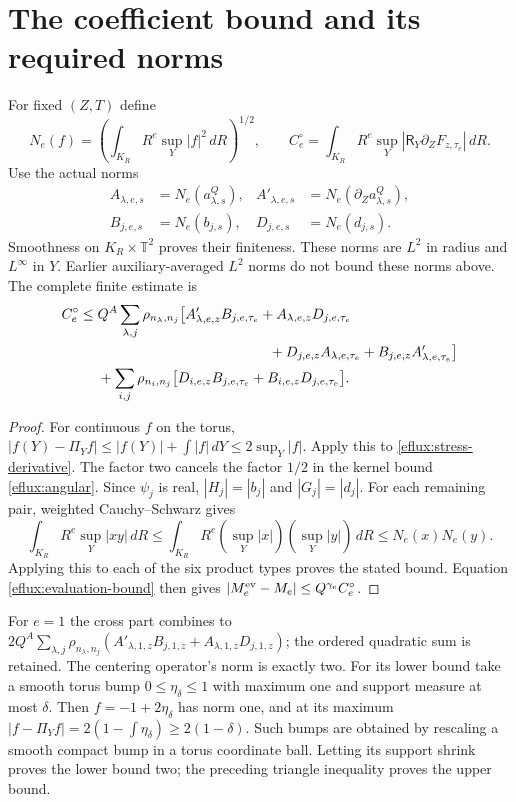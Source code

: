 \section{The coefficient bound and its required norms}
\label{eflux:bound-section}
For fixed $(Z,T)$ define
\[
N_e(f)=\left(\int_{K_R}R^e\sup_Y|f|^2\,dR\right)^{1/2},\qquad
C_e^\circ=\int_{K_R}R^e\sup_Y|\mathsf R_Y\partial_ZF_{z,\tau_e}|\,dR .
\]
Use the actual norms
\begin{equation}
\begin{aligned}
A_{\lambda,e,s}&=N_e(a^Q_{\lambda,s}),&
A'_{\lambda,e,s}&=N_e(\partial_Za^Q_{\lambda,s}),\\
B_{j,e,s}&=N_e(b_{j,s}),&
D_{j,e,s}&=N_e(d_{j,s}).
\end{aligned}\label{eflux:norms}
\end{equation}
Smoothness on $K_R\times\mathbb T^2$ proves their finiteness.
These norms are $L^2$ in radius and $L^\infty$ in $Y$.
Earlier auxiliary-averaged $L^2$ norms do not bound these norms above.
The complete finite estimate is
\begin{align}
C_e^\circ\le{}&
Q^A\sum_{\lambda,j}\rho_{n_\lambda,n_j}
\bigl[A'_{\lambda,e,z}B_{j,e,\tau_e}
+A_{\lambda,e,z}D_{j,e,\tau_e}\nonumber\\
&\hspace{43mm}+D_{j,e,z}A_{\lambda,e,\tau_e}
+B_{j,e,z}A'_{\lambda,e,\tau_e}\bigr]\nonumber\\
&+\sum_{i,j}\rho_{n_i,n_j}
\bigl[D_{i,e,z}B_{j,e,\tau_e}+B_{i,e,z}D_{j,e,\tau_e}\bigr].
\label{eflux:envelope}
\end{align}
\begin{proof}
For continuous $f$ on the torus,
$|f(Y)-\Pi_Yf|\le |f(Y)|+\int|f|\,dY\le2\sup_Y|f|$.
Apply this to \eqref{eflux:stress-derivative}.
The factor two cancels the factor $1/2$ in the kernel bound
\eqref{eflux:angular}. Since $\psi_j$ is real,
$|H_j|=|b_j|$ and $|G_j|=|d_j|$.
For each remaining pair, weighted Cauchy--Schwarz gives
\[
\int_{K_R}R^e\sup_Y|xy|\,dR
\le\int_{K_R}R^e(\sup_Y|x|)(\sup_Y|y|)\,dR
\le N_e(x)N_e(y).
\]
Applying this to each of the six product types proves the stated
bound. Equation \eqref{eflux:evaluation-bound} then gives
$|M_e^{\rm ev}-M_e|\le Q^{\gamma_e}C_e^\circ$.
\end{proof}
For $e=1$ the cross part combines to
$2Q^A\sum_{\lambda,j}\rho_{n_\lambda,n_j}
(A'_{\lambda,1,z}B_{j,1,z}+A_{\lambda,1,z}D_{j,1,z})$;
the ordered quadratic sum is retained.
The centering operator's norm is exactly two.
For its lower bound take a smooth torus bump $0\le\eta_\delta\le1$
with maximum one and support measure at most $\delta$.
Then $f=-1+2\eta_\delta$ has norm one, and at its maximum
$|f-\Pi_Yf|=2(1-\int\eta_\delta)\ge2(1-\delta)$.
Such bumps are obtained by rescaling a smooth compact bump in a torus
coordinate ball. Letting its support shrink proves the lower bound
two; the preceding triangle inequality proves the upper bound.

